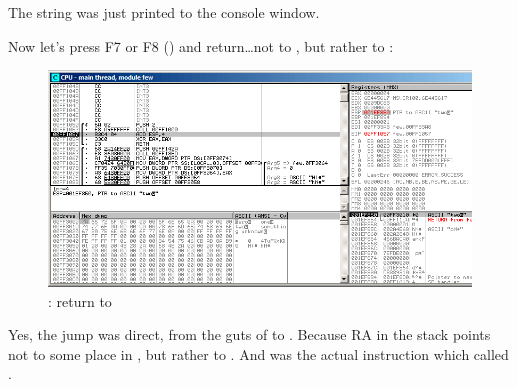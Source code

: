 The string  was just printed to the console window.

\clearpage
Now let's press F7 or F8 (\stepover) and return\dots not to \ttf , but rather to \main:

\begin{figure}[H]
\centering
\includegraphics[scale=\FigScale]{patterns/08_switch/1_few/olly8.png}
\caption{\olly: return to \main}
\label{fig:switch_few_olly8}
\end{figure}

Yes, the jump was direct, from the guts of \printf to \main.
Because \ac{RA} in the stack points not to some place in \ttf , but rather to \main.
And \CALL {} was the actual instruction which called \ttf.


